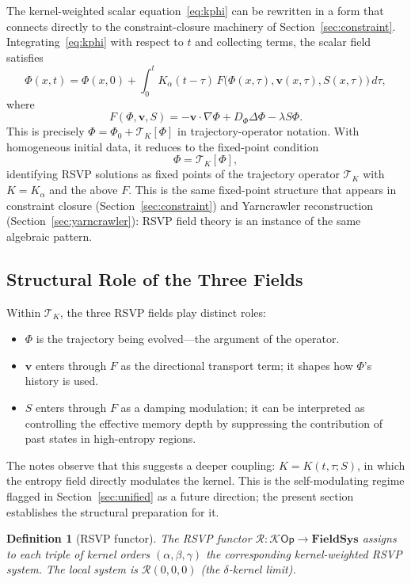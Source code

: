 \documentclass[12pt]{article}
\newtheorem{definition}[theorem]{Definition}
\newcommand{\Kcal}{\mathcal{K}}
\newcommand{\TK}{\mathcal{T}_K}
\begin{document}
The kernel-weighted scalar equation~\eqref{eq:kphi} can be rewritten in
a form that connects directly to the constraint-closure machinery of
Section~\ref{sec:constraint}. Integrating~\eqref{eq:kphi} with respect to
$t$ and collecting terms, the scalar field satisfies
\[
  \Phi(x,t) = \Phi(x,0)
  + \int_0^t K_\alpha(t-\tau)\,
    F\bigl(\Phi(x,\tau),\mathbf{v}(x,\tau),S(x,\tau)\bigr)\, d\tau,
\]
where
\[
  F(\Phi,\mathbf{v},S) =
  -\mathbf{v}\cdot\nabla\Phi + D_\Phi\Delta\Phi - \lambda S\Phi.
\]
This is precisely $\Phi = \Phi_0 + \TK[\Phi]$ in trajectory-operator
notation. With homogeneous initial data, it reduces to the fixed-point
condition
\[
  \Phi = \TK[\Phi],
\]
identifying RSVP solutions as fixed points of the trajectory operator
$\TK$ with $K = K_\alpha$ and the above $F$. This is the same fixed-point
structure that appears in constraint closure (Section~\ref{sec:constraint})
and Yarncrawler reconstruction (Section~\ref{sec:yarncrawler}): RSVP field
theory is an instance of the same algebraic pattern.

\subsection{Structural Role of the Three Fields}

Within $\TK$, the three RSVP fields play distinct roles:
\begin{itemize}
  \item $\Phi$ is the trajectory being evolved---the argument of the operator.
  \item $\mathbf{v}$ enters through $F$ as the directional transport term;
    it shapes how $\Phi$'s history is used.
  \item $S$ enters through $F$ as a damping modulation; it can be interpreted
    as controlling the effective memory depth by suppressing the contribution
    of past states in high-entropy regions.
\end{itemize}

The notes observe that this suggests a deeper coupling: $K = K(t,\tau; S)$,
in which the entropy field directly modulates the kernel. This is the
self-modulating regime flagged in Section~\ref{sec:unified} as a future
direction; the present section establishes the structural preparation for it.

\begin{definition}[RSVP functor]
The \emph{RSVP functor}
$\mathcal{R} \colon \Kcal\mathsf{Op} \to \mathbf{FieldSys}$
assigns to each triple of kernel orders $(\alpha, \beta, \gamma)$ the
corresponding kernel-weighted RSVP system. The local system is
$\mathcal{R}(0, 0, 0)$ (the $\delta$-kernel limit).
\end{definition}
\end{document}
